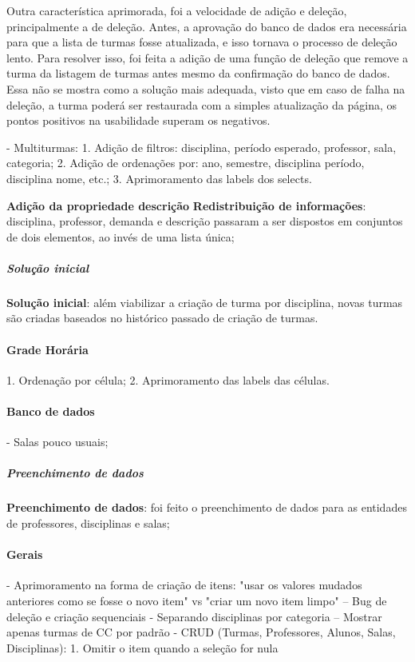 Outra característica aprimorada, foi a velocidade de adição e deleção, principalmente a de deleção. Antes, a aprovação do banco de dados era necessária para que a lista de turmas fosse atualizada, e isso tornava o processo de deleção lento. Para resolver isso, foi feita a adição de uma função de deleção que remove a turma da listagem de turmas antes mesmo da confirmação do banco de dados. Essa não se mostra como a solução mais adequada, visto que em caso de falha na deleção, a turma poderá ser restaurada com a simples atualização da página, os pontos positivos na usabilidade superam os negativos.

- Multiturmas:
1. Adição de filtros: disciplina, período esperado, professor, sala, categoria;
2. Adição de ordenações por: ano, semestre, disciplina período, disciplina nome, etc.;
3. Aprimoramento das labels dos selects.

\textbf{Adição da propriedade descrição}
\textbf{Redistribuição de informações}: disciplina, professor, demanda e descrição passaram a ser dispostos em conjuntos de dois elementos, ao invés de uma lista única;

\subparagraph*{Solução inicial}

\textbf{Solução inicial}: além viabilizar a criação de turma por disciplina, novas turmas são criadas baseados no histórico passado de criação de turmas.

\paragraph*{Grade Horária}

1. Ordenação por célula;
2. Aprimoramento das labels das células.

\paragraph*{Banco de dados}

- Salas pouco usuais;

\subparagraph*{Preenchimento de dados}
\textbf{Preenchimento de dados}: foi feito o preenchimento de dados para as entidades de professores, disciplinas e salas;

\paragraph*{Gerais}

- Aprimoramento na forma de criação de itens: "usar os valores mudados anteriores como se fosse o novo item" vs "criar um novo item limpo"
-- Bug de deleção e criação sequenciais
- Separando disciplinas por categoria
-- Mostrar apenas turmas de CC por padrão
- CRUD (Turmas, Professores, Alunos, Salas, Disciplinas):
1. Omitir o item quando a seleção for nula

